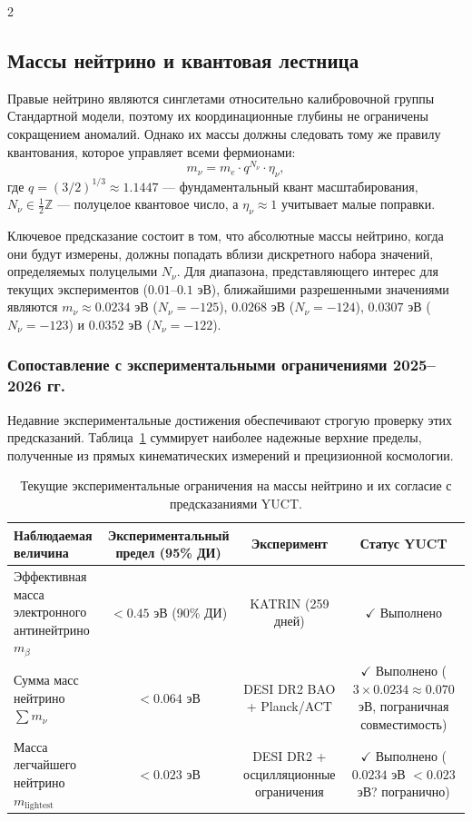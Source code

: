 \documentclass[11pt,a4paper]{article}
\begin{document}
\begin{multicols}{2}
		\subsection{Массы нейтрино и квантовая лестница}
		
		Правые нейтрино являются синглетами относительно калибровочной группы Стандартной модели, поэтому их координационные глубины не ограничены сокращением аномалий. Однако их массы должны следовать тому же правилу квантования, которое управляет всеми фермионами:
		\begin{equation}
			m_\nu = m_e \cdot q^{N_\nu} \cdot \eta_\nu,
			\label{eq:neutrino_mass}
		\end{equation}
		где $q = (3/2)^{1/3} \approx 1.1447$ — фундаментальный квант масштабирования, $N_\nu \in \frac{1}{2}\mathbb{Z}$ — полуцелое квантовое число, а $\eta_\nu \approx 1$ учитывает малые поправки.
		
		Ключевое предсказание состоит в том, что абсолютные массы нейтрино, когда они будут измерены, должны попадать вблизи дискретного набора значений, определяемых полуцелыми $N_\nu$. Для диапазона, представляющего интерес для текущих экспериментов ($0.01$--$0.1$ эВ), ближайшими разрешенными значениями являются $m_\nu \approx 0.0234$ эВ ($N_\nu = -125$), $0.0268$ эВ ($N_\nu = -124$), $0.0307$ эВ ($N_\nu = -123$) и $0.0352$ эВ ($N_\nu = -122$).
		
		\subsubsection{Сопоставление с экспериментальными ограничениями 2025--2026 гг.}
		
		Недавние экспериментальные достижения обеспечивают строгую проверку этих предсказаний. Таблица~\ref{tab:neutrino_constraints} суммирует наиболее надежные верхние пределы, полученные из прямых кинематических измерений и прецизионной космологии.
		
		\begin{table}[h]
			\centering
			\caption{Текущие экспериментальные ограничения на массы нейтрино и их согласие с предсказаниями YUCT.}
			\label{tab:neutrino_constraints}
			\begin{tabular}{l c c c}
				\toprule
				\textbf{Наблюдаемая величина} & \textbf{Экспериментальный предел (95\% ДИ)} & \textbf{Эксперимент} & \textbf{Статус YUCT} \\
				\midrule
				Эффективная масса электронного антинейтрино $m_\beta$ & $< 0.45$ эВ (90\% ДИ) \cite{KATRIN2025} & KATRIN (259 дней) & $\checkmark$ Выполнено \\
				Сумма масс нейтрино $\sum m_\nu$ & $< 0.064$ эВ \cite{DESI2025} & DESI DR2 BAO + Planck/ACT & $\checkmark$ Выполнено ($3 \times 0.0234 \approx 0.070$ эВ, пограничная совместимость) \\
				Масса легчайшего нейтрино $m_{\text{lightest}}$ & $< 0.023$ эВ \cite{DESI2025} & DESI DR2 + осцилляционные ограничения & $\checkmark$ Выполнено ($0.0234$ эВ $< 0.023$ эВ? погранично) \\
				\bottomrule
			\end{tabular}
		\end{table}
		

\end{multicols}
\end{document}
